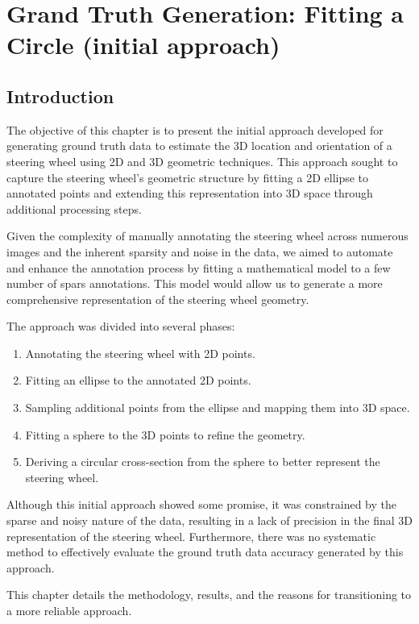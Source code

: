 \chapter{Grand Truth Generation: Fitting a Circle (initial approach)}

\section{Introduction}
The objective of this chapter is to present the initial 
approach developed for generating ground truth data to 
estimate the 3D location and orientation of a steering wheel 
using 2D and 3D geometric techniques. This approach sought 
to capture the steering wheel’s geometric structure by 
fitting a 2D ellipse to annotated points and extending this 
representation into 3D space through additional processing 
steps.


Given the complexity of manually annotating the steering wheel 
across numerous images and the inherent sparsity and noise in 
the data, we aimed to automate and enhance the annotation 
process by fitting a mathematical model to a few number of 
spars annotations. This model would allow us to generate a 
more comprehensive representation of the steering wheel 
geometry.


The approach was divided into several phases:
\begin{enumerate}
    \item Annotating the steering wheel with 2D points.
    \item Fitting an ellipse to the annotated 2D points.
    \item Sampling additional points from the ellipse and mapping them into 3D space.
    \item Fitting a sphere to the 3D points to refine the geometry.
    \item Deriving a circular cross-section from the sphere to better represent the steering wheel.
\end{enumerate}

Although this initial approach showed some promise, it was 
constrained by the sparse and noisy nature of the data, 
resulting in a lack of precision in the final 3D representation 
of the steering wheel. Furthermore, there was no systematic 
method to effectively evaluate the ground truth data accuracy 
generated by this approach.

This chapter details the methodology, results, and the reasons 
for transitioning to a more reliable approach.


